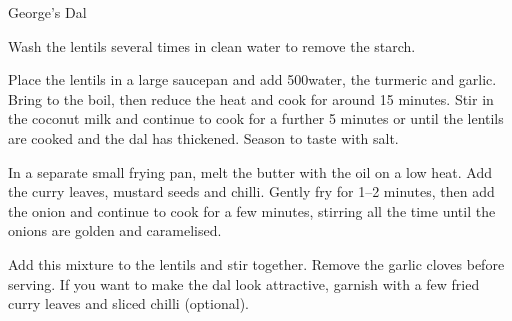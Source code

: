 \begin{recipe}[\vegan]{George's Dal}

    \begin{ingredients}
    \end{ingredients}

    \begin{instructions}
        Wash the lentils several times in clean water to remove the starch.

        Place the lentils in a large saucepan and add 500\ml water, the turmeric and garlic. Bring to the boil, then reduce the heat and cook for around 15 minutes. Stir in the coconut milk and continue to cook for a further 5 minutes or until the lentils are cooked and the dal has thickened. Season to taste with salt.

        In a separate small frying pan, melt the butter with the oil on a low heat. Add the curry leaves, mustard seeds and chilli. Gently fry for 1–2 minutes, then add the onion and continue to cook for a few minutes, stirring all the time until the onions are golden and caramelised.

        Add this mixture to the lentils and stir together. Remove the garlic cloves before serving. If you want to make the dal look attractive, garnish with a few fried curry leaves and sliced chilli (optional).
    \end{instructions}
\end{recipe}
